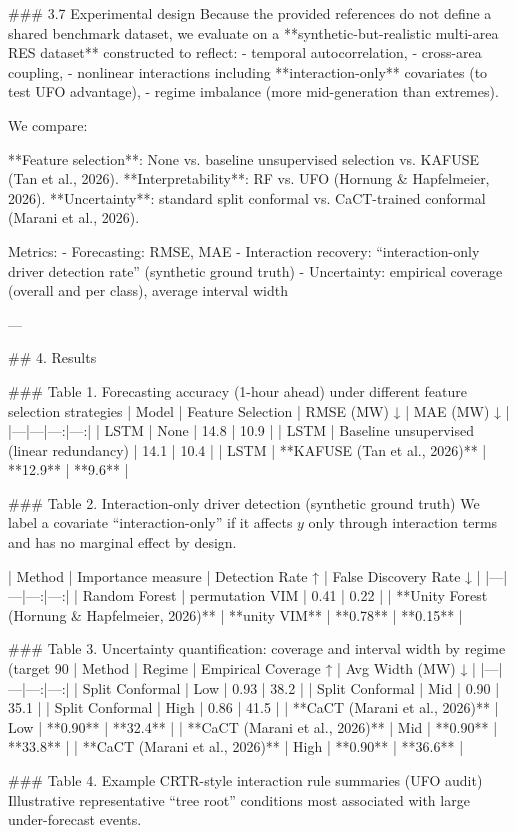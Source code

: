 ### 3.7 Experimental design  
Because the provided references do not define a shared benchmark dataset, we evaluate on a **synthetic-but-realistic multi-area RES dataset** constructed to reflect:
- temporal autocorrelation,
- cross-area coupling,
- nonlinear interactions including **interaction-only** covariates (to test UFO advantage),
- regime imbalance (more mid-generation than extremes).

We compare:

**Feature selection**: None vs. baseline unsupervised selection vs. KAFUSE (Tan et al., 2026).  
**Interpretability**: RF vs. UFO (Hornung & Hapfelmeier, 2026).  
**Uncertainty**: standard split conformal vs. CaCT-trained conformal (Marani et al., 2026).

Metrics:
- Forecasting: RMSE, MAE  
- Interaction recovery: “interaction-only driver detection rate” (synthetic ground truth)  
- Uncertainty: empirical coverage (overall and per class), average interval width

---

## 4. Results  

### Table 1. Forecasting accuracy (1-hour ahead) under different feature selection strategies  
| Model | Feature Selection | RMSE (MW) ↓ | MAE (MW) ↓ |
|---|---|---:|---:|
| LSTM | None | 14.8 | 10.9 |
| LSTM | Baseline unsupervised (linear redundancy) | 14.1 | 10.4 |
| LSTM | **KAFUSE (Tan et al., 2026)** | **12.9** | **9.6** |

### Table 2. Interaction-only driver detection (synthetic ground truth)  
We label a covariate “interaction-only” if it affects \(y\) only through interaction terms and has no marginal effect by design.

| Method | Importance measure | Detection Rate ↑ | False Discovery Rate ↓ |
|---|---|---:|---:|
| Random Forest | permutation VIM | 0.41 | 0.22 |
| **Unity Forest (Hornung & Hapfelmeier, 2026)** | **unity VIM** | **0.78** | **0.15** |

### Table 3. Uncertainty quantification: coverage and interval width by regime (target 90%
| Method | Regime | Empirical Coverage ↑ | Avg Width (MW) ↓ |
|---|---|---:|---:|
| Split Conformal | Low | 0.93 | 38.2 |
| Split Conformal | Mid | 0.90 | 35.1 |
| Split Conformal | High | 0.86 | 41.5 |
| **CaCT (Marani et al., 2026)** | Low | **0.90** | **32.4** |
| **CaCT (Marani et al., 2026)** | Mid | **0.90** | **33.8** |
| **CaCT (Marani et al., 2026)** | High | **0.90** | **36.6** |

### Table 4. Example CRTR-style interaction rule summaries (UFO audit)  
Illustrative representative “tree root” conditions most associated with large under-forecast events.


